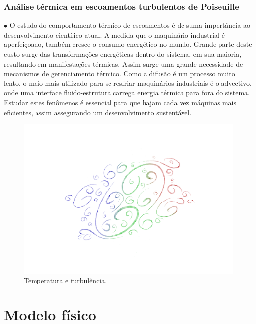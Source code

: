 \documentclass[xcolor=dvipsnames,10pt,aspectratio=169]{beamer}
\begin{document}
	
		\begin{frame}
		\frametitle{Análise térmica em escoamentos turbulentos de Poiseuille}
			\begin{minipage}[h!]{0.49\textwidth}
			$\bullet$ O estudo do comportamento térmico de escoamentos é de suma importância ao desenvolvimento científico atual. A medida que o maquinário industrial é aperfeiçoado, também cresce o consumo energético no mundo. Grande parte deste custo surge das transformações energéticas dentro do sistema, em sua maioria, resultando em manifestações térmicas. Assim surge uma grande necessidade de mecanismos de gerenciamento térmico. Como a difusão é um processo muito lento, o meio mais utilizado para se resfriar maquinários industriais é o advectivo, onde uma interface fluido-estrutura carrega energia térmica para fora do sistema. Estudar estes fenômenos é essencial para que hajam cada vez máquinas mais eficientes, assim assegurando um desenvolvimento sustentável. 
		\end{minipage}
		\begin{minipage}[h!]{0.49\textwidth}
			\begin{figure}[h!]
				\centering
				\includegraphics[trim = {1.7cm 2cm 0 1cm}, clip , angle=0, scale=0.60]{turbulence}
				\caption{Temperatura e turbulência.}
			\end{figure}
		\end{minipage}
		\end{frame}





	\section{Modelo físico}
	
\end{document}

